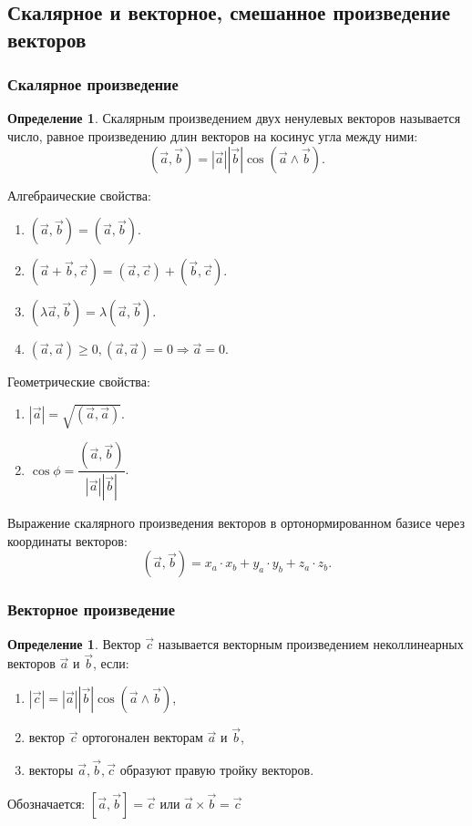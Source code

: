 \documentclass[12pt]{report}
\theoremstyle{definition}
\newtheorem{definition}[theorem]{Определение}
\begin{document}
\subsection{Скалярное и векторное, смешанное произведение векторов}
\subsubsection{Скалярное произведение}
\begin{definition}
Скалярным произведением двух ненулевых векторов называется
число, равное произведению длин векторов на косинус угла между
ними:
$$
(\vec{a}, \vec{b}) = |\vec{a}| |\vec{b}| \cos(\vec{a} \wedge \vec{b}).
$$
\end{definition}

Алгебраические свойства:
\begin{enumerate}
\item $(\vec{a}, \vec{b}) = (\vec{a}, \vec{b})$.
\item $(\vec{a} + \vec{b}, \vec{c}) = (\vec{a}, \vec{c}) + (\vec{b}, \vec{c})$.
\item $(\lambda \vec{a}, \vec{b}) = \lambda (\vec{a}, \vec{b})$.
\item $(\vec{a}, \vec{a}) \ge 0, (\vec{a}, \vec{a}) = 0 \Rightarrow \vec{a} = 0$.
\end{enumerate}

Геометрические свойства:
\begin{enumerate}
\item $|\vec{a}| = \sqrt{(\vec{a}, \vec{a})}$.
\item $\cos \phi = \dfrac{(\vec{a}, \vec{b})}{|\vec{a}||\vec{b}|}$.
\end{enumerate}

Выражение скалярного произведения векторов в ортонормированном
базисе через координаты векторов:
$$
(\vec{a}, \vec{b}) = x_a \cdot x_b + y_a \cdot y_b + z_a \cdot z_b.
$$

\subsubsection{Векторное произведение}
\begin{definition}
Вектор $\vec{c}$ называется векторным произведением неколлинеарных векторов 
$\vec{a}$ и $\vec{b}$, если:
\begin{enumerate}
  \item $|\vec{c}| = |\vec{a}| |\vec{b}| \cos(\vec{a} \wedge \vec{b})$,
  \item вектор $\vec{c}$ ортогонален векторам $\vec{a}$ и $\vec{b}$,
  \item векторы $\vec{a}, \vec{b}, \vec{c}$ образуют правую тройку векторов.
\end{enumerate}

Обозначается: $[\vec{a}, \vec{b}] = \vec{c}$ или $\vec{a} \times \vec{b} = \vec{c}$

\end{definition}
\end{document}
